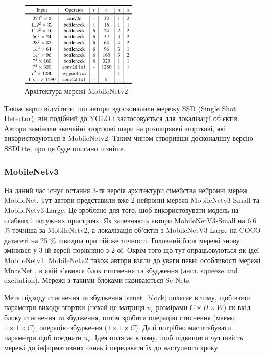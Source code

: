 \begin{figure}[H]
    \centering
    \includegraphics[width=0.5\textwidth]{images/cnn_mobilenetv2_architecture}
    \caption{Архітектура мережі MobileNetv2     \cite{mobilenetv2}
        \label{fig:cnn:mobilenetv2_architecture}
    }
\end{figure}


Також варто відмітити, що автори вдосконалили мережу SSD (Single Shot Detector), він подібний
до YOLO і застосовується для локалізації об'єктів. Автори замінили звичайні згорткові шари
на розширяючі згорткові, які використовуються в MobileNetv2. Таким чином створивши досконалішу
версію SSDLite, про це буде описано пізніше.

\subsubsection{MobileNetv3}

На даний час існує остання 3-тя версія \cite{mobilenetv3} архітектури сімейства нейронні мереж MobileNet.
Тут автори представили вже 2 нейронні мережі MobileNetv3-Small та MobileNetv3-Large.
Це зроблено для того, щоб використовувати модель на слабких і потужних пристроях.
Як запевняють автори MobileNetV3-Small на 6.6 \% точніша за MobileNetv2, а локалізація об'єктів
з MobileNetV3-Large на COCO датасеті на 25 \% швидша при тій же точності.
Головний блок мережі знову змінився у 3-ій версії порівняно з 2-ої.
Окрім того що тут опрацьовуються як ідеї MobileNetv1, MobileNetv2 також автори взяли
до уваги певні особливості мережі MnasNet \cite{mnasnet}, в якій з'явився блок стиснення та збудження
(англ. squeeze and excitation). Мережі з такими блоками називаються Se-Nets.

Мета підходу стиснення та збудження \ref{senet_block} полягає в тому, щоб взяти параметри виходу згортки (нехай
це матриця $u_c$ розмірами $C \times H \times W$) 
як вхід блоку стиснення та збудження,
потім зробити операцію стиснення (маємо $1 \times 1 \times C$), операцію збудження ($1 \times 1 \times C$). Далі
потрібно масштабувати параметри щоб поєднати $u_c$.
Ідея полягає в тому, щоб підвищити чутливість мережі до інформативних ознак і передавати їх
до наступного кроку.

